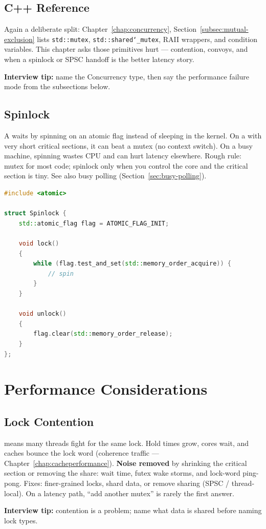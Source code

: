 \subsection{C++ Reference}
\label{subsec:sync-reference}
Again a deliberate split: Chapter~\ref{chap:concurrency}, 
Section~\ref{subsec:mutual-exclusion} lists \texttt{std::mutex}, 
\texttt{std::shared\char`_mutex}, RAII wrappers, and condition variables. 
This chapter asks  those primitives hurt --- contention, convoys, 
and when a spinlock or SPSC handoff is the better latency story.
\par\noindent\textbf{Interview tip:} name the Concurrency type, then say the performance 
failure mode from the subsections below.

\subsection{Spinlock}
\label{subsec:spinlock}
A  waits by spinning on an atomic flag instead of sleeping in the kernel. 
On a  with very short critical sections, it can beat a mutex 
(no context switch). On a busy machine, spinning wastes CPU and can hurt latency elsewhere.
\newline
Rough rule: mutex for most code; spinlock only when you control the core and the critical 
section is tiny. See also busy polling (Section~\ref{sec:busy-polling}).

\begin{lstlisting}[language=C++]
#include <atomic>

struct Spinlock {
    std::atomic_flag flag = ATOMIC_FLAG_INIT;

    void lock()
    {
        while (flag.test_and_set(std::memory_order_acquire)) {
            // spin
        }
    }

    void unlock()
    {
        flag.clear(std::memory_order_release);
    }
};
\end{lstlisting}

\section{Performance Considerations}
\label{sec:sync-performance}

\subsection{Lock Contention}
\label{subsec:lock-contention}
 means many threads fight for the same lock. Hold times grow, cores wait, 
and caches bounce the lock word (coherence traffic --- Chapter~\ref{chap:cacheperformance}).
\newline
\textbf{Noise removed} by shrinking the critical section or removing the share: wait time, 
futex wake storms, and lock-word ping-pong. Fixes: finer-grained locks, shard data, or 
remove sharing (SPSC / thread-local). On a latency path, ``add another mutex'' is rarely 
the first answer.
\par\noindent\textbf{Interview tip:} contention is a  problem; name what 
data is shared before naming lock types.

